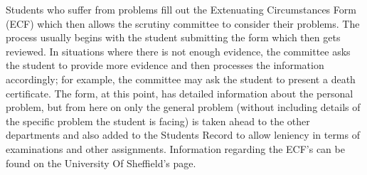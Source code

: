 \documentclass[../main.tex]{subfiles}
\begin{document}
\raggedright

Students who suffer from problems fill out the Extenuating Circumstances Form (ECF) which then allows the scrutiny committee to consider their problems. The process usually begins
with the student submitting the form which then gets reviewed. In situations where there is not enough evidence, the committee asks the student to provide more evidence and then processes the information accordingly; for example, the committee may ask the student to present a death certificate. The form, at this point, has detailed information about the personal problem, but from here on only the general problem (without including details of the specific problem the student is facing) is taken ahead to the other departments and also added to the Students Record to allow leniency in terms of examinations and other assignments. Information regarding the ECF's can be found on the University
Of Sheffield's page.\cite{ecfuni}
\end{document}
